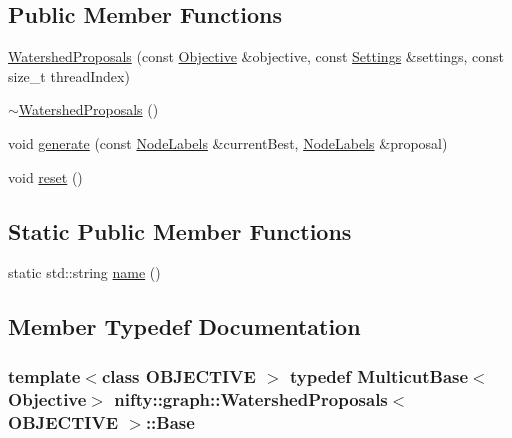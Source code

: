 \subsection*{Public Member Functions}
\begin{DoxyCompactItemize}
\item 
\hyperlink{classnifty_1_1graph_1_1WatershedProposals_ab1911fe9ef1a543dd06ec717aaccd311}{Watershed\+Proposals} (const \hyperlink{classnifty_1_1graph_1_1WatershedProposals_a6c8b1e69ffce69a32dc4a1a5fdd8b455}{Objective} \&objective, const \hyperlink{structnifty_1_1graph_1_1WatershedProposals_1_1Settings}{Settings} \&settings, const size\+\_\+t thread\+Index)
\item 
\hyperlink{classnifty_1_1graph_1_1WatershedProposals_afec4765189f57d7a20f60f4bfb814e2b}{$\sim$\+Watershed\+Proposals} ()
\item 
void \hyperlink{classnifty_1_1graph_1_1WatershedProposals_afa676a3f6c3bfbc586830faf4f658eb9}{generate} (const \hyperlink{classnifty_1_1graph_1_1WatershedProposals_aaf3781be9f0ca924072375a681149673}{Node\+Labels} \&current\+Best, \hyperlink{classnifty_1_1graph_1_1WatershedProposals_aaf3781be9f0ca924072375a681149673}{Node\+Labels} \&proposal)
\item 
void \hyperlink{classnifty_1_1graph_1_1WatershedProposals_a312df197f5047813e840f90aa07ffe1f}{reset} ()
\end{DoxyCompactItemize}
\subsection*{Static Public Member Functions}
\begin{DoxyCompactItemize}
\item 
static std\+::string \hyperlink{classnifty_1_1graph_1_1WatershedProposals_a22ff2b41f49840cb9821fffd4d6f026b}{name} ()
\end{DoxyCompactItemize}


\subsection{Member Typedef Documentation}
\hypertarget{classnifty_1_1graph_1_1WatershedProposals_addfa29bbb1e705c4ea5eed5b700ec6ac}{}
\subsubsection[{Base}]{\setlength{\rightskip}{0pt plus 5cm}template$<$class O\+B\+J\+E\+C\+T\+I\+V\+E $>$ typedef {\bf Multicut\+Base}$<${\bf Objective}$>$ {\bf nifty\+::graph\+::\+Watershed\+Proposals}$<$ O\+B\+J\+E\+C\+T\+I\+V\+E $>$\+::{\bf Base}}\label{classnifty_1_1graph_1_1WatershedProposals_addfa29bbb1e705c4ea5eed5b700ec6ac}
\hypertarget{classnifty_1_1graph_1_1WatershedProposals_a193558ab36f22b02bd769212a3369304}{}
